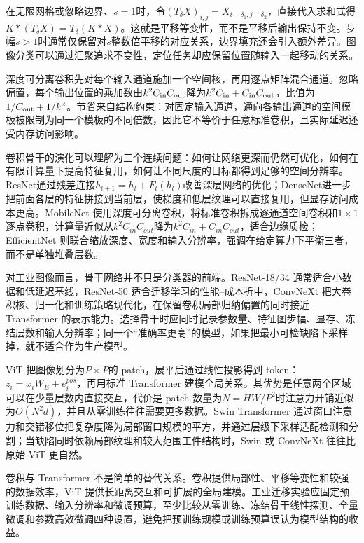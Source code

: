 在无限网格或忽略边界、$s=1$时，令$(T_\delta X)_{i,j}=X_{i-\delta_1,j-\delta_2}$，直接代入求和式得$K*(T_\delta X)=T_\delta(K*X)$。这就是平移等变性，而不是平移后输出保持不变。步幅$s>1$时通常仅保留对$s$整数倍平移的对应关系，边界填充还会引入额外差异。图像分类可以通过汇聚追求不变性，定位任务却应保留位置随输入一起移动的关系。

深度可分离卷积先对每个输入通道施加一个空间核，再用逐点矩阵混合通道。忽略偏置，每个输出位置的乘加数由$k^2C_{\rm in}C_{\rm out}$降为$k^2C_{\rm in}+C_{\rm in}C_{\rm out}$，比值为$1/C_{\rm out}+1/k^2$。节省来自结构约束：对固定输入通道，通向各输出通道的空间模板被限制为同一个模板的不同倍数，因此它不等价于任意标准卷积，且实际延迟还受内存访问影响。

卷积骨干的演化可以理解为三个连续问题：如何让网络更深而仍然可优化，如何在有限计算量下提高特征复用，如何让不同尺度的目标都得到足够的空间分辨率。ResNet通过残差连接$h_{l+1}=h_l+F_l(h_l)$改善深层网络的优化；DenseNet进一步把前面各层的特征拼接到当前层，使梯度和低层纹理可以直接复用，但显存访问成本更高。MobileNet 使用深度可分离卷积，将标准卷积拆成逐通道空间卷积和$1\times1$逐点卷积，计算量近似从$k^2C_{in}C_{out}$降为$k^2C_{in}+C_{in}C_{out}$，适合边缘质检；EfficientNet 则联合缩放深度、宽度和输入分辨率，强调在给定算力下平衡三者，而不是单独堆叠层数。

对工业图像而言，骨干网络并不只是分类器的前端。ResNet-18/34 通常适合小数据和低延迟基线，ResNet-50 适合迁移学习的性能--成本折中，ConvNeXt 把大卷积核、归一化和训练策略现代化，在保留卷积局部归纳偏置的同时接近 Transformer 的表示能力。选择骨干时应同时记录参数量、特征图步幅、显存、冻结层数和输入分辨率；同一个“准确率更高”的模型，如果把最小可检缺陷下采样掉，就不适合作为生产模型。

ViT 把图像划分为$P\times P$的 patch，展平后通过线性投影得到 token：$z_i=x_iW_E+e_i^{pos}$，再用标准 Transformer 建模全局关系。其优势是任意两个区域可以在少量层数内直接交互，代价是 patch 数量为$N=HW/P^2$时注意力开销近似为$O(N^2d)$，并且从零训练往往需要更多数据。Swin Transformer 通过窗口注意力和交错移位把复杂度降为局部窗口规模的平方，并通过层级下采样适配检测和分割；当缺陷同时依赖局部纹理和较大范围工件结构时，Swin 或 ConvNeXt 往往比原始 ViT 更自然。

卷积与 Transformer 不是简单的替代关系。卷积提供局部性、平移等变性和较强的数据效率，ViT 提供长距离交互和可扩展的全局建模。工业迁移实验应固定预训练数据、输入分辨率和微调预算，至少比较从零训练、冻结骨干线性探测、全量微调和参数高效微调四种设置，避免把预训练规模或训练预算误认为模型结构的收益。

